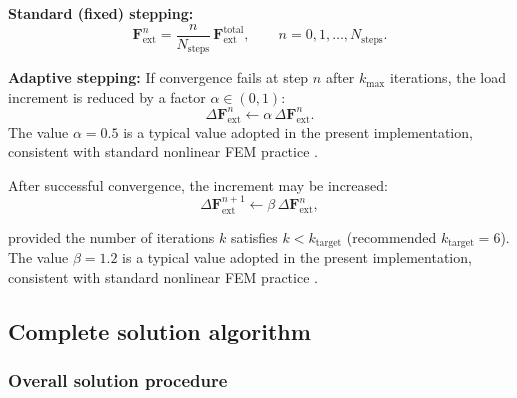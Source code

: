 \documentclass[11pt]{article}
\begin{document}
\textbf{Standard (fixed) stepping:}
\begin{equation}
\mathbf{F}_{\mathrm{ext}}^{n}
= \frac{n}{N_{\mathrm{steps}}}\,\mathbf{F}_{\mathrm{ext}}^{\mathrm{total}},
\qquad
n=0,1,\ldots,N_{\mathrm{steps}}.
\label{s7:fixed_step}
\end{equation}

\textbf{Adaptive stepping:}
If convergence fails at step $n$ after $k_{\max}$ iterations,
the load increment is reduced by a factor $\alpha\in(0,1)$:
\begin{equation}
\Delta\mathbf{F}_{\mathrm{ext}}^{n}
\leftarrow \alpha\,\Delta\mathbf{F}_{\mathrm{ext}}^{n}.
\label{s7:adaptive_step}
\end{equation}
The value $\alpha=0.5$ is a typical value adopted in the present
implementation, consistent with standard nonlinear FEM practice
\cite{Bathe2006,Belytschko2000}.

After successful convergence, the increment may be increased:
\begin{equation}
\Delta\mathbf{F}_{\mathrm{ext}}^{n+1}
\leftarrow \beta\,\Delta\mathbf{F}_{\mathrm{ext}}^{n},
\label{s7:increase_step}
\end{equation}

provided the number of iterations $k$ satisfies $k<k_{\mathrm{target}}$
(recommended $k_{\mathrm{target}}=6$). The value $\beta=1.2$ is a
typical value adopted in the present implementation, consistent with
standard nonlinear FEM practice \cite{Bathe2006,Belytschko2000}.

\subsection{Complete solution algorithm}
\label{ssec:algorithm}

\subsubsection{Overall solution procedure}
\end{document}
